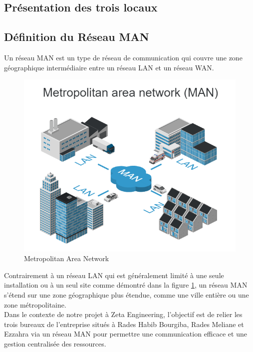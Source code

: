 \subsection{Présentation des trois locaux}



\subsection{Définition du Réseau MAN}

Un réseau MAN est un type de réseau de communication qui couvre une zone géographique intermédiaire entre un réseau LAN et un réseau WAN. \cite{sze1985metropolitan} \\


\begin{figure}[H]
 \centering
    \includegraphics[width=15cm]{Images/network-man1.png}
    \caption{Metropolitan Area Network}
    \label{Chap2.3.1}
\end{figure}  
\smallskip

Contrairement à un réseau LAN qui est généralement limité à une seule installation ou à un seul site comme démontré dans la figure \ref{Chap2.3.1}, un réseau MAN s'étend sur une zone géographique plus étendue, comme une ville entière ou une zone métropolitaine.  \\


Dans le contexte de notre projet à Zeta Engineering, l'objectif est de relier les trois bureaux de l'entreprise situés à Rades Habib Bourgiba, Rades Meliane et Ezzahra via un réseau MAN pour permettre une communication efficace et une gestion centralisée des ressources.  \\



